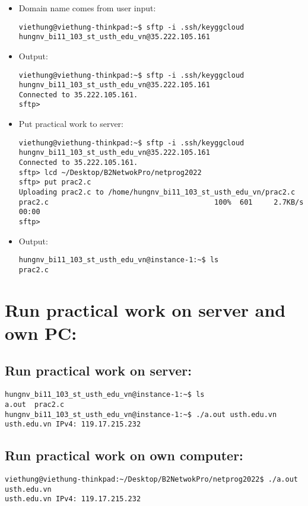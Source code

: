 \documentclass[12pt]{article}
\begin{document}
\begin{itemize}
    \item Domain name comes from user input:
    \begin{verbatim}
viethung@viethung-thinkpad:~$ sftp -i .ssh/keyggcloud 
hungnv_bi11_103_st_usth_edu_vn@35.222.105.161
    \end{verbatim}
    \item Output:
    \begin{verbatim}
viethung@viethung-thinkpad:~$ sftp -i .ssh/keyggcloud 
hungnv_bi11_103_st_usth_edu_vn@35.222.105.161
Connected to 35.222.105.161.
sftp>
    \end{verbatim}
    \item Put practical work to server:
    \begin{verbatim}
viethung@viethung-thinkpad:~$ sftp -i .ssh/keyggcloud 
hungnv_bi11_103_st_usth_edu_vn@35.222.105.161
Connected to 35.222.105.161.
sftp> lcd ~/Desktop/B2NetwokPro/netprog2022
sftp> put prac2.c
Uploading prac2.c to /home/hungnv_bi11_103_st_usth_edu_vn/prac2.c
prac2.c                                       100%  601     2.7KB/s   00:00    
sftp> 
    \end{verbatim}
    \item Output:
    \begin{verbatim}
hungnv_bi11_103_st_usth_edu_vn@instance-1:~$ ls
prac2.c
    \end{verbatim}
\end{itemize}

\section{Run practical work on server and own PC:}

\subsection{Run practical work on server:}
\begin{verbatim}
hungnv_bi11_103_st_usth_edu_vn@instance-1:~$ ls
a.out  prac2.c
hungnv_bi11_103_st_usth_edu_vn@instance-1:~$ ./a.out usth.edu.vn
usth.edu.vn IPv4: 119.17.215.232
\end{verbatim}

\subsection{Run practical work on own computer:}
\begin{verbatim}
viethung@viethung-thinkpad:~/Desktop/B2NetwokPro/netprog2022$ ./a.out usth.edu.vn
usth.edu.vn IPv4: 119.17.215.232
\end{verbatim}
\end{document}
